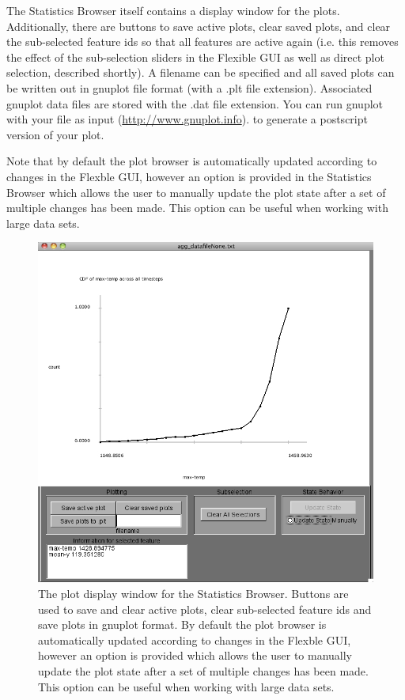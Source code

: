 The Statistics Browser itself contains a display window for the plots.  Additionally, there are buttons to 
save active plots, clear saved plots, and clear the sub-selected feature ids so that all features are active 
again (i.e. this removes the effect of the sub-selection sliders in the Flexible GUI as well as direct plot selection, described shortly).
A filename can be specified and all saved plots can be written out in gnuplot file format (with a .plt file extension).  
Associated gnuplot data files are stored with the .dat file extension.  You can run gnuplot with your file as input (\url{http://www.gnuplot.info}).
to generate a postscript version of your plot.  

Note that by default the plot browser is automatically updated according to changes in the Flexble GUI, however an 
  option is provided in the Statistics Browser which allows the user to manually update the plot state after a set of multiple
  changes has been made.  This option can be useful when working with large data sets.

\begin{figure}[h]
  \center
  \includegraphics[width=6in]{jpeg/statsBrowser.jpg} 
  \caption{The plot display window for the Statistics Browser.  Buttons are used to save and clear
    active plots, clear sub-selected feature ids and save plots in gnuplot format. By default
  the plot browser is automatically updated according to changes in the Flexble GUI, however an 
  option is provided which allows the user to manually update the plot state after a set of multiple
  changes has been made.  This option can be useful when working with large data sets.}
  \label{fig:statsBrowser}
\end{figure}


